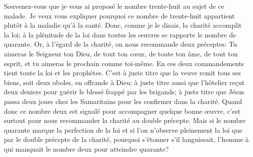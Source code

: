 Souvenez-vous
		que je vous ai proposé le nombre trente-huit au sujet de ce malade.
Je veux vous expliquer pourquoi ce nombre de trente-huit
	appartient plutôt à la maladie qu’à la santé.
Donc, comme je le disais, la charité accomplit la loi;
	à la plénitude de la loi dans toutes les œuvres
	se rapporte le nombre de quarante.
Or, à l’égard de la charité, on nous recommande deux préceptes:
	Tu aimeras le Seigneur ton Dieu, de tout ton cœur,
		de toute ton âme, de tout ton esprit,
	et tu aimeras le prochain comme toi-même.
En ces deux commandements tient toute la loi et les prophètes.
C’est à juste titre que la veuve remit tous ses biens,
		soit deux oboles, en offrande à Dieu;
	à juste titre aussi que l’hôtelier reçut deux deniers
		pour guérir le blessé frappé par les brigands;
	à juste titre que Jésus passa deux jours chez les Samaritains
		pour les confirmer dans la charité.
Quand donc ce nombre deux est signalé pour accompagner quelque bonne œuvre,
	c’est surtout pour nous recommander la charité au double précepte.
Mais si le nombre quarante marque la perfection de la loi
	et si l’on n’observe pleinement la loi
		que par le double précepte de la charité,
	pourquoi s’étonner s’il languissait,
	l’homme à qui manquait le nombre deux pour atteindre quarante?
